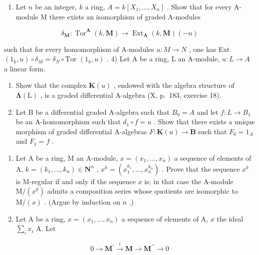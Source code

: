 \begin{enumerate}
\def\labelenumi{\arabic{enumi})}
\setcounter{enumi}{2}
\tightlist
\item
  Let \(n\) be an integer, \(k\) a ring, \(A = k[X_1, \ldots, X_n]\) . Show that for every A-module M there exists an isomorphism of graded A-modules
\end{enumerate}

\[
\delta_ {\mathbf {M}}: \operatorname{Tor} ^ {\mathbf {A}} (k, \mathbf {M}) \rightarrow \operatorname{Ext} _ {\mathbf {A}} (k, \mathbf {M}) (- n)
\]

such that for every homomorphism of A-modules \(u: M \to N\) , one has Ext \((1_k, u) \circ \delta_M = \delta_N \circ \text{Tor } (1_k, u)\) . 4) Let A be a ring, L an A-module, \(u: L \to A\) a linear form.

\begin{enumerate}
\def\labelenumi{\alph{enumi})}
\item
  Show that the complex \(\mathbf{K}(u)\) , endowed with the algebra structure of \(\symbf{\Lambda}(\mathrm{L})\) , is a graded differential A-algebra (X, p.~183, exercise 18).
\item
  Let B be a differential graded A-algebra such that \(B_{0} = A\) and let \(f : L \to B_{1}\) be an A-homomorphism such that \(d_{1} \circ f = u\) . Show that there exists a unique morphism of graded differential A-algebras \(F : \mathbf{K}(u) \to \mathbf{B}\) such that \(F_{0} = 1_{A}\) and \(F_{1} = f\) .
\end{enumerate}

\begin{enumerate}
\def\labelenumi{\arabic{enumi})}
\setcounter{enumi}{4}
\item
  Let A be a ring, M an A-module, \(x = (x_1, \ldots, x_n)\) a sequence of elements of A, \(k = (k_1, \ldots, k_n) \in \mathbf{N}^n\) , \(x^k = (x_1^{k_1}, \ldots, x_{n}^{k_n})\) . Prove that the sequence \(x^k\) is M-regular if and only if the sequence \(x\) is; in that case the A-module \(\mathrm{M}/(x^k)\) admits a composition series whose quotients are isomorphic to \(\mathrm{M}/(x)\) . (Argue by induction on \(n\) .)
\item
  Let A be a ring, \(x = (x_1, \ldots, x_n)\) a sequence of elements of A, \(x\) the ideal \(\sum_{i} x_i\) A. Let
\end{enumerate}

\[
0 \rightarrow \mathbf {M} ^ {\prime} \stackrel {i} {\rightarrow} \mathbf {M} \rightarrow \mathbf {M} ^ {\prime \prime} \rightarrow 0
\]

